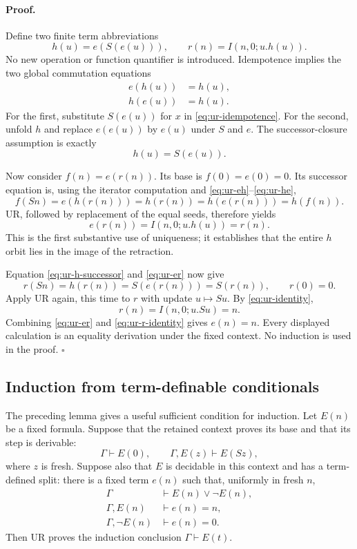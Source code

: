 \paragraph{Proof.}
Define two finite term abbreviations
\[
 h(u)=e(S(e(u))),\qquad r(n)=I(n,0;u.h(u)).
\]
No new operation or function quantifier is introduced.  Idempotence
implies the two global commutation equations
\begin{align}
 e(h(u))&=h(u),\label{eq:ur-eh}\\
 h(e(u))&=h(u).\label{eq:ur-he}
\end{align}
For the first, substitute $S(e(u))$ for $x$ in
\eqref{eq:ur-idempotence}.  For the second, unfold $h$ and replace
$e(e(u))$ by $e(u)$ under $S$ and $e$.  The successor-closure
assumption is exactly
\[
 h(u)=S(e(u)).
 \tag{H}\label{eq:ur-h-successor}
\]

Now consider $f(n)=e(r(n))$.  Its base is
$f(0)=e(0)=0$.  Its successor equation is, using the iterator
computation and \eqref{eq:ur-eh}--\eqref{eq:ur-he},
\[
 f(Sn)=e(h(r(n)))=h(r(n))=h(e(r(n)))=h(f(n)).
\]
UR, followed by replacement of the equal seeds, therefore yields
\[
 e(r(n))=I(n,0;u.h(u))=r(n).
 \tag{R1}\label{eq:ur-er}
\]
This is the first substantive use of uniqueness; it establishes that
the entire $h$ orbit lies in the image of the retraction.

Equation \eqref{eq:ur-h-successor} and \eqref{eq:ur-er} now give
\[
 r(Sn)=h(r(n))=S(e(r(n)))=S(r(n)),\qquad r(0)=0.
\]
Apply UR again, this time to $r$ with update $u\mapsto Su$.
By \eqref{eq:ur-identity},
\[
 r(n)=I(n,0;u.Su)=n.
 \tag{R2}\label{eq:ur-r-identity}
\]
Combining \eqref{eq:ur-er} and \eqref{eq:ur-r-identity} gives
$e(n)=n$.  Every displayed calculation is an equality derivation
under the fixed context.  No induction is used in the proof.
\hfill$\square$

\subsection{Induction from term-definable conditionals}

The preceding lemma gives a useful sufficient condition for induction.
Let $E(n)$ be a fixed formula.  Suppose that the retained context
proves its base and that its step is derivable:
\[
 \Gamma\vdash E(0),\qquad
 \Gamma,E(z)\vdash E(Sz),
 \tag{P}\label{eq:ur-ind-premises}
\]
where $z$ is fresh.  Suppose also that $E$ is decidable in this
context and has a term-defined split: there is a fixed term $e(n)$
such that, uniformly in fresh $n$,
\begin{align}
 \Gamma&\vdash E(n)\lor\neg E(n),\label{eq:ur-dec}\\
 \Gamma,E(n)&\vdash e(n)=n,\label{eq:ur-true-branch}\\
 \Gamma,\neg E(n)&\vdash e(n)=0.\label{eq:ur-false-branch}
\end{align}
Then UR proves the induction conclusion $\Gamma\vdash E(t)$.

